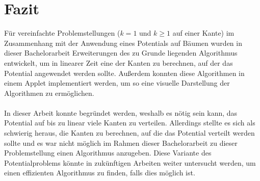 \section{Fazit}


Für vereinfachte Problemstellungen ($k = 1$ und $k \geq 1$ auf einer Kante) im Zusammenhang mit der Anwendung eines Potentials auf Bäumen wurden in dieser Bachelorarbeit Erweiterungen des zu Grunde liegenden Algorithmus entwickelt, um in linearer Zeit eine der Kanten zu berechnen, auf der das Potential angewendet werden sollte. Außerdem konnten diese Algorithmen in einem Applet implementiert werden, um so eine visuelle Darstellung der Algorithmen zu ermöglichen.
\\
\\
In dieser Arbeit konnte begründet werden, weshalb es nötig sein kann, das Potential auf bis zu linear viele Kanten zu verteilen. Allerdings stellte es sich als schwierig heraus, die Kanten zu berechnen, auf die das Potential verteilt werden sollte und es war nicht möglich im Rahmen dieser Bachelorarbeit zu dieser Problemstellung einen Algorithmus anzugeben. Diese Variante des Potentialproblems könnte in zukünftigen Arbeiten weiter untersucht werden, um einen effizienten Algorithmus zu finden, falls dies möglich ist.
